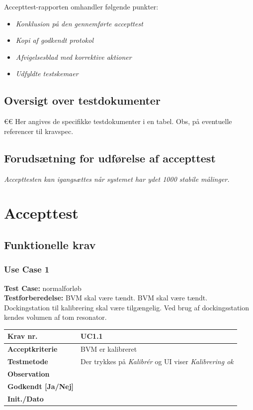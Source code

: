 			Accepttest-rapporten omhandler følgende punkter: 
			\begin{itemize}
				\item \textit{Konklusion på den gennemførte accepttest}
				\item \textit{Kopi af godkendt protokol}
				\item \textit{Afvigelsesblad med korrektive aktioner}
				\item \textit{Udfyldte testskemaer}
			\end{itemize}
			
		\subsection{Oversigt over testdokumenter}
		€€ Her angives de specifikke testdokumenter i en tabel. Obs, på eventuelle referencer til kravspec. 
		
		\subsection{Forudsætning for udførelse af accepttest}
		
		\textit{Accepttesten kan igangsættes når systemet har ydet 1000 stabile målinger.} 
		
\section{Accepttest}

		
\subsection{Funktionelle krav}

\subsubsection{Use Case 1}
\textbf{Test Case:} normalforløb \\
\textbf{Testforberedelse:} BVM skal være tændt. BVM skal være tændt. Dockingstation til kalibrering skal være tilgængelig. Ved brug af dockingsstation kendes volumen af tom resonator. \\

\begin{tabularx}{1\textwidth}{|l|X|}
\hline
\textbf{Krav nr.}              & UC1.1  \\ \hline
\textbf{Acceptkriterie}        & BVM er kalibreret \\ \hline
\textbf{Testmetode}            & Der trykkes på \textit{Kalibrér} og UI viser \textit{Kalibrering ok} \\ \hline
\textbf{Observation}           &  \\ \hline
\textbf{Godkendt {[}Ja/Nej{]}} &  \\ \hline
\textbf{Init./Dato}            &  \\ \hline
\end{tabularx}
				


